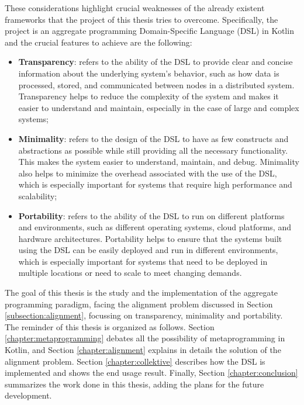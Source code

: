 These considerations highlight crucial weaknesses of the already existent frameworks that the project of this thesis tries to overcome. Specifically, the project is an aggregate programming Domain-Specific Language (DSL) in Kotlin and the crucial features to achieve are the following:
\begin{itemize}
    \item \textbf{Transparency}: refers to the ability of the DSL to provide clear and concise information about the underlying system's behavior, such as how data is processed, stored, and communicated between nodes in a distributed system. Transparency helps to reduce the complexity of the system and makes it easier to understand and maintain, especially in the case of large and complex systems;
    \item \textbf{Minimality}: refers to the design of the DSL to have as few constructs and abstractions as possible while still providing all the necessary functionality. This makes the system easier to understand, maintain, and debug. Minimality also helps to minimize the overhead associated with the use of the DSL, which is especially important for systems that require high performance and scalability;
    \item \textbf{Portability}: refers to the ability of the DSL to run on different platforms and environments, such as different operating systems, cloud platforms, and hardware architectures. Portability helps to ensure that the systems built using the DSL can be easily deployed and run in different environments, which is especially important for systems that need to be deployed in multiple locations or need to scale to meet changing demands.
\end{itemize}

The goal of this thesis is the study and the implementation of the aggregate programming paradigm, facing the alignment problem discussed in Section \ref{subsection:alignment}, focussing on transparency, minimality and portability.\newline
The reminder of this thesis is organized as follows. Section \ref{chapter:metaprogramming} debates all the possibility of metaprogramming in Kotlin, and Section \ref{chapter:alignment} explains in details the solution of the alignment problem. Section \ref{chapter:collektive} describes how the DSL is implemented and shows the end usage result. Finally, Section \ref{chapter:conclusion} summarizes the work done in this thesis, adding the plans for the future development.
